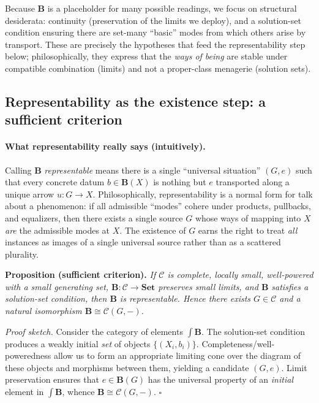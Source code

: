 \documentclass[11pt]{article}
\theoremstyle{upright}
\begin{document}
Because \(\mathbf B\) is a placeholder for many possible readings, we focus on structural desiderata: continuity (preservation of the limits we deploy), and a solution-set condition ensuring there are set-many ``basic'' modes from which others arise by transport. These are precisely the hypotheses that feed the representability step below; philosophically, they express that the \emph{ways of being} are stable under compatible combination (limits) and not a proper-class menagerie (solution sets).

\subsection{Representability as the existence step: a sufficient criterion}
\paragraph{What representability really says (intuitively).}
Calling $\mathbf B$ \emph{representable} means there is a single ``universal situation'' $(G,e)$ such that every concrete datum $b\in \mathbf B(X)$ is nothing but $e$ transported along a unique arrow $u:G\to X$. Philosophically, representability is a normal form for talk about a phenomenon: if all admissible “modes” cohere under products, pullbacks, and equalizers, then there exists a single source $G$ whose ways of mapping into $X$ \emph{are} the admissible modes at $X$. The existence of $G$ earns the right to treat \emph{all} instances as images of a single universal source rather than as a scattered plurality.

\noindent\textbf{Proposition (sufficient criterion).}
\emph{If \(\mathcal C\) is complete, locally small, well-powered with a small generating set, \(\mathbf B:\mathcal C\to\mathbf{Set}\) preserves small limits, and \(\mathbf B\) satisfies a solution-set condition, then \(\mathbf B\) is representable. Hence there exists \(G\in\mathcal C\) and a natural isomorphism \(\mathbf B \cong \mathcal C(G,-)\).} \citep{MacLane1998}

\smallskip
\noindent\emph{Proof sketch.}
Consider the category of elements \(\int\!\mathbf B\). The solution-set condition produces a weakly initial \emph{set} of objects \(\{(X_i,b_i)\}\). Completeness/well-poweredness allow us to form an appropriate limiting cone over the diagram of these objects and morphisms between them, yielding a candidate \((G,e)\). Limit preservation ensures that \(e\in\mathbf B(G)\) has the universal property of an \emph{initial} element in \(\int\!\mathbf B\), whence \(\mathbf B\cong \mathcal C(G,-)\). \(\square\)
\end{document}
